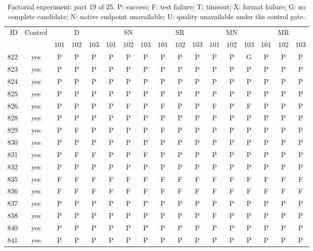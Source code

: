 \begin{table}[p]\centering\footnotesize
\setlength{\tabcolsep}{3pt}
\caption{Factorial experiment: part 19 of 25. P: success; F: test failure; T: timeout; X: format failure; G: no complete candidate; N: native endpoint unavailable; U: quality unavailable under the control gate.}
\begin{tabular*}{\textwidth}{@{\extracolsep{\fill}}rcccccccccccccccc}\toprule
ID & Control & \multicolumn{3}{c}{D} & \multicolumn{3}{c}{SN} & \multicolumn{3}{c}{SR} & \multicolumn{3}{c}{MN} & \multicolumn{3}{c}{MR}\\
\cmidrule(lr){3-5}\cmidrule(lr){6-8}\cmidrule(lr){9-11}\cmidrule(lr){12-14}\cmidrule(lr){15-17}
 & & 101 & 102 & 103 & 101 & 102 & 103 & 101 & 102 & 103 & 101 & 102 & 103 & 101 & 102 & 103\\\midrule
822 & yes & P & P & P & P & P & P & P & P & P & P & P & G & P & P & P\\
823 & yes & P & P & P & P & P & P & P & P & P & P & P & P & P & P & P\\
824 & yes & P & P & P & P & P & P & P & P & P & P & P & P & P & P & P\\
825 & yes & P & P & P & P & P & P & P & P & P & P & P & P & P & P & P\\
826 & yes & P & P & P & P & F & P & F & P & P & F & P & F & P & P & P\\
828 & yes & P & P & P & P & P & P & P & P & P & P & P & P & P & P & P\\
829 & yes & P & F & P & P & P & P & F & P & P & P & P & P & P & P & P\\
830 & yes & P & P & P & P & P & P & P & P & P & P & P & P & P & P & P\\
831 & yes & P & F & F & P & P & F & P & P & P & P & P & P & P & P & P\\
832 & yes & P & P & P & P & P & P & P & P & P & P & P & P & P & P & P\\
835 & yes & F & F & F & F & F & F & F & F & F & F & F & F & F & F & F\\
836 & yes & F & F & F & F & F & F & F & F & F & F & F & F & F & F & F\\
837 & yes & P & P & P & P & P & P & P & P & P & P & P & P & P & P & P\\
838 & yes & P & P & P & P & P & P & P & P & P & F & P & P & P & P & P\\
840 & yes & P & P & P & P & P & P & P & P & P & P & P & P & P & P & P\\
841 & yes & P & P & P & P & P & P & P & P & P & P & P & P & P & P & P\\

\end{tabular*}
\end{table}
